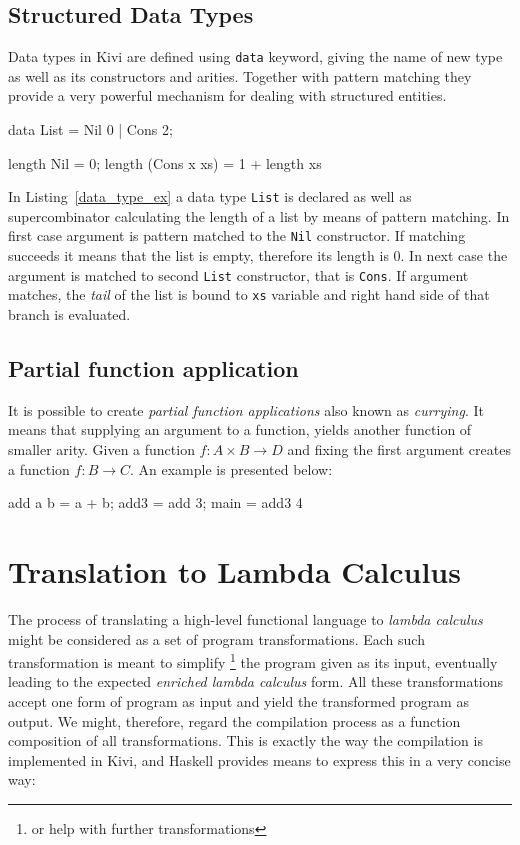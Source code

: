 \documentclass[12pt,a4paper]{report}
\begin{document}
\subsection{Structured Data Types}
Data types in Kivi are defined using \texttt{data} keyword, giving the name of
new type as well as its constructors and arities. Together with pattern matching they
provide a very powerful mechanism for dealing with structured entities.

\vspace*{0.2in}
\begin{code}[style=haskell,label=data_type_ex,caption={Calculating length of list.}]
data List = Nil 0 | Cons 2;

length Nil = 0;
length (Cons x xs) = 1 + length xs
\end{code}

In Listing~\ref{data_type_ex} a data type \texttt{List} is declared as well as
supercombinator calculating the length of a list by means of pattern matching.
In first case argument is pattern matched to the \texttt{Nil} constructor. If
matching succeeds it means that the list is empty, therefore its length is 0.
In next case the argument is matched to second \texttt{List} constructor, that
is \texttt{Cons}. If argument matches, the \textit{tail} of the list is bound to
\texttt{xs} variable and right hand side of that branch is evaluated.

\subsection{Partial function application}
It is possible to create \textit{partial function applications} also known as
\textit{currying}. It means that supplying an argument to a function, yields
another function of smaller arity. Given a function $f : A \times B \rightarrow
D$ and fixing the first argument creates a function $f : B \rightarrow C$. An
example is presented below:

\vspace*{0.2in}
\begin{code}[style=haskell,caption={Partial application of addition.}]
add a b = a + b;
add3 = add 3;
main = add3 4
\end{code}

\section{Translation to Lambda Calculus}
The process of translating a high-level functional language to \textit{lambda
calculus} might be considered as a set of program transformations. Each such
transformation is meant to simplify \footnote{or help with further
transformations} the program given as its input, eventually leading to the
expected \textit{enriched lambda calculus} form. All these transformations
accept one form of program as input and yield the transformed program as
output. We might, therefore, regard the compilation process as a function
composition of all transformations. This is exactly the way the compilation is
implemented in Kivi, and Haskell provides means to express this in a very
concise way:
\end{document}
